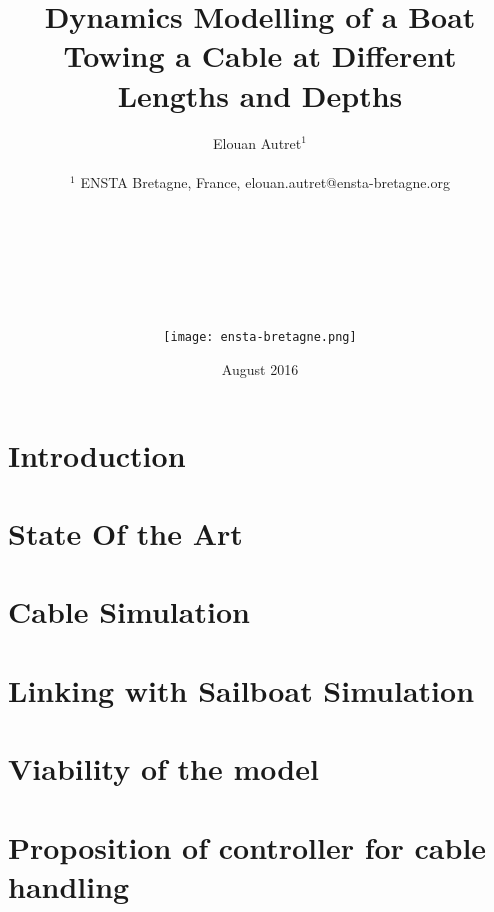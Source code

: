 \documentclass[twoside,12pt]{report} %
\title{ Dynamics Modelling of a Boat Towing a Cable at Different Lengths and Depths }
\author{Elouan Autret$^{1}$\\
\\
\normalsize{$^{1}$ ENSTA Bretagne, France, elouan.autret@ensta-bretagne.org}\\\\\\\\\\\\\\\\
\texttt{[image: ensta-bretagne.png]}
}
\date{August 2016}
\begin{document}
\renewcommand{\contentsname}{Contents}	%
\renewcommand{\bibname}{Bibliography}	%




\cleardoublepage  %

\tableofcontents  %

\listoffigures  %
\listoftables   %


\chapter*{Introduction}


\chapter{State Of the Art}

\chapter{Cable Simulation}


\chapter{Linking with Sailboat Simulation}


\chapter{Viability of the model}



\chapter{Proposition of controller for cable  handling}

\end{document}
